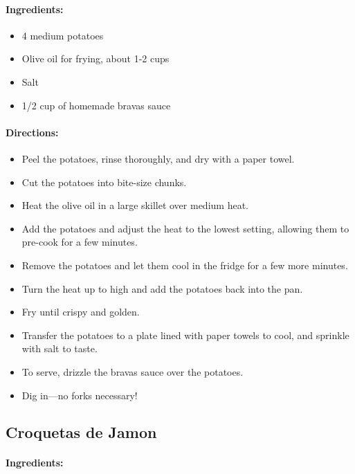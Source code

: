 \documentclass{article}
\begin{document}
\paragraph{Ingredients:}

\begin{itemize}
	\item 4 medium potatoes
	\item Olive oil for frying, about 1-2 cups
	\item Salt
	\item 1/2 cup of homemade bravas sauce
\end{itemize}

\paragraph{Directions:}
\begin{itemize}
	\item Peel the potatoes, rinse thoroughly, and dry with a paper towel.
	\item Cut the potatoes into bite-size chunks.
	\item Heat the olive oil in a large skillet over medium heat.
	\item Add the potatoes and adjust the heat to the lowest setting, allowing them to pre-cook for a few minutes.
	\item Remove the potatoes and let them cool in the fridge for a few more minutes.
	\item Turn the heat up to high and add the potatoes back into the pan.
	\item Fry until crispy and golden.
	\item Transfer the potatoes to a plate lined with paper towels to cool, and sprinkle with salt to taste.
	\item To serve, drizzle the bravas sauce over the potatoes.
	\item Dig in—no forks necessary!
\end{itemize}

\subsection{Croquetas de Jamon}

\paragraph{Ingredients:}
\end{document}
